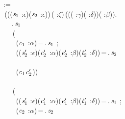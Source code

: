 \,\,\,:=\\
\,\,\,\,(\HOLTokenLambda{}((\ensuremath{\HOLBoundVar{s}\sb{\mathrm{1}}} :\ensuremath{\epsilon})\HOLSymConst{,}(\ensuremath{\HOLBoundVar{s}\sb{\mathrm{2}}} :\ensuremath{\epsilon}))\,( :\ensuremath{\zeta})\,((( :\ensuremath{\gamma})\HOLSymConst{,}( :\ensuremath{\delta}))\HOLSymConst{,}( :\ensuremath{\beta})).\\
\,\,\,\,\,\,\,\,\,\,.\,\ensuremath{\HOLBoundVar{s}\sb{\mathrm{1}}}\,\,\\
\,\,\,\,\,\,\,\,\,\,\,(\\
\,\,\,\,\,\,\,\,\,\,\,\,\,\,(\ensuremath{\HOLBoundVar{c}\sb{\mathrm{1}}} :\ensuremath{\alpha})\,=\,.\,\ensuremath{\HOLBoundVar{s}\sb{\mathrm{1}}}\,\,;\\
\,\,\,\,\,\,\,\,\,\,\,\,\,\,((\ensuremath{\HOLBoundVar{s}\sb{\mathrm{2}}\sp{\prime{}}} :\ensuremath{\epsilon})\HOLSymConst{,}(\ensuremath{\HOLBoundVar{c}\sb{\mathrm{2}}\sp{\prime{}}} :\ensuremath{\alpha})\HOLSymConst{,}(\ensuremath{\HOLBoundVar{e}\sb{\mathrm{2}}\sp{\prime{}}} :\ensuremath{\beta})\HOLSymConst{,}(\ensuremath{\HOLBoundVar{t}\sb{\mathrm{2}}\sp{\prime{}}} :\ensuremath{\delta}))\,=\,.\,\ensuremath{\HOLBoundVar{s}\sb{\mathrm{2}}}\,\,\\
\,\,\,\,\,\,\,\,\,\,\,\,\\
\,\,\,\,\,\,\,\,\,\,\,\,\,\,(\ensuremath{\HOLBoundVar{c}\sb{\mathrm{1}}}\HOLSymConst{,}\ensuremath{\HOLBoundVar{c}\sb{\mathrm{2}}\sp{\prime{}}}))\\
\,\,\,\,\,\,\,\,\,\\
\,\,\,\,\,\,\,\,\,\,\,(\\
\,\,\,\,\,\,\,\,\,\,\,\,\,\,((\ensuremath{\HOLBoundVar{s}\sb{\mathrm{1}}\sp{\prime{}}} :\ensuremath{\epsilon})\HOLSymConst{,}(\ensuremath{\HOLBoundVar{c}\sb{\mathrm{1}}\sp{\prime{}}} :\ensuremath{\alpha})\HOLSymConst{,}(\ensuremath{\HOLBoundVar{e}\sb{\mathrm{1}}\sp{\prime{}}} :\ensuremath{\beta})\HOLSymConst{,}(\ensuremath{\HOLBoundVar{t}\sb{\mathrm{1}}\sp{\prime{}}} :\ensuremath{\delta}))\,=\,.\,\ensuremath{\HOLBoundVar{s}\sb{\mathrm{1}}}\,\,;\\
\,\,\,\,\,\,\,\,\,\,\,\,\,\,(\ensuremath{\HOLBoundVar{c}\sb{\mathrm{2}}} :\ensuremath{\alpha})\,=\,.\,\ensuremath{\HOLBoundVar{s}\sb{\mathrm{2}}}\,\,\\
